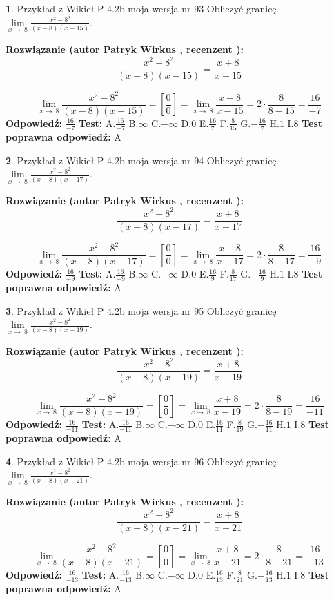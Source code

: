 \documentclass[12pt, a4paper]{article}
\theoremstyle{definition} %
\newtheorem{zad}{}
\newcommand{\zadStart}[1]{\begin{zad}#1\newline}
\newcommand{\zadStop}{\end{zad}}
\newcommand{\rozwStart}[2]{\noindent \textbf{Rozwiązanie (autor #1 , recenzent #2): }\newline}
\newcommand{\rozwStop}{\newline}
\newcommand{\odpStart}{\noindent \textbf{Odpowiedź:}\newline}
\newcommand{\odpStop}{\newline}
\newcommand{\testStart}{\noindent \textbf{Test:}\newline}
\newcommand{\testStop}{\newline}
\newcommand{\kluczStart}{\noindent \textbf{Test poprawna odpowiedź:}\newline}
\newcommand{\kluczStop}{\newline}
\begin{document}
\zadStart{Przykład z Wikieł P 4.2b moja wersja nr 93}
Obliczyć granicę $\lim\limits_{x\to\ 8}\frac{x^{2}-8^{2}}{(x-8)(x-15)}$.
\zadStop
\rozwStart{Patryk Wirkus}{}
$$\frac{x^{2}-8^{2}}{(x-8)(x-15)}=\frac{x+8}{x-15}$$

$$\lim\limits_{x\to\ 8}\frac{x^{2}-8^{2}}{(x-8)(x-15)}=[\frac{0}{0}]=\lim\limits_{x\to\ 8}\frac{x+8}{x-15}=2 \cdot \frac{8}{8-15} = \frac{16}{-7}$$
\rozwStop
\odpStart
$\frac{16}{-7}$
\odpStop
\testStart
A.$\frac{16}{-7}$
B.$\infty$
C.$-\infty$
D.$0$
E.$\frac{16}{7}$
F.$\frac{8}{15}$
G.$-\frac{16}{7}$
H.$1$
I.$8$
\testStop
\kluczStart
A
\kluczStop



\zadStart{Przykład z Wikieł P 4.2b moja wersja nr 94}
Obliczyć granicę $\lim\limits_{x\to\ 8}\frac{x^{2}-8^{2}}{(x-8)(x-17)}$.
\zadStop
\rozwStart{Patryk Wirkus}{}
$$\frac{x^{2}-8^{2}}{(x-8)(x-17)}=\frac{x+8}{x-17}$$

$$\lim\limits_{x\to\ 8}\frac{x^{2}-8^{2}}{(x-8)(x-17)}=[\frac{0}{0}]=\lim\limits_{x\to\ 8}\frac{x+8}{x-17}=2 \cdot \frac{8}{8-17} = \frac{16}{-9}$$
\rozwStop
\odpStart
$\frac{16}{-9}$
\odpStop
\testStart
A.$\frac{16}{-9}$
B.$\infty$
C.$-\infty$
D.$0$
E.$\frac{16}{9}$
F.$\frac{8}{17}$
G.$-\frac{16}{9}$
H.$1$
I.$8$
\testStop
\kluczStart
A
\kluczStop



\zadStart{Przykład z Wikieł P 4.2b moja wersja nr 95}
Obliczyć granicę $\lim\limits_{x\to\ 8}\frac{x^{2}-8^{2}}{(x-8)(x-19)}$.
\zadStop
\rozwStart{Patryk Wirkus}{}
$$\frac{x^{2}-8^{2}}{(x-8)(x-19)}=\frac{x+8}{x-19}$$

$$\lim\limits_{x\to\ 8}\frac{x^{2}-8^{2}}{(x-8)(x-19)}=[\frac{0}{0}]=\lim\limits_{x\to\ 8}\frac{x+8}{x-19}=2 \cdot \frac{8}{8-19} = \frac{16}{-11}$$
\rozwStop
\odpStart
$\frac{16}{-11}$
\odpStop
\testStart
A.$\frac{16}{-11}$
B.$\infty$
C.$-\infty$
D.$0$
E.$\frac{16}{11}$
F.$\frac{8}{19}$
G.$-\frac{16}{11}$
H.$1$
I.$8$
\testStop
\kluczStart
A
\kluczStop



\zadStart{Przykład z Wikieł P 4.2b moja wersja nr 96}
Obliczyć granicę $\lim\limits_{x\to\ 8}\frac{x^{2}-8^{2}}{(x-8)(x-21)}$.
\zadStop
\rozwStart{Patryk Wirkus}{}
$$\frac{x^{2}-8^{2}}{(x-8)(x-21)}=\frac{x+8}{x-21}$$

$$\lim\limits_{x\to\ 8}\frac{x^{2}-8^{2}}{(x-8)(x-21)}=[\frac{0}{0}]=\lim\limits_{x\to\ 8}\frac{x+8}{x-21}=2 \cdot \frac{8}{8-21} = \frac{16}{-13}$$
\rozwStop
\odpStart
$\frac{16}{-13}$
\odpStop
\testStart
A.$\frac{16}{-13}$
B.$\infty$
C.$-\infty$
D.$0$
E.$\frac{16}{13}$
F.$\frac{8}{21}$
G.$-\frac{16}{13}$
H.$1$
I.$8$
\testStop
\kluczStart
A
\kluczStop
\end{document}
